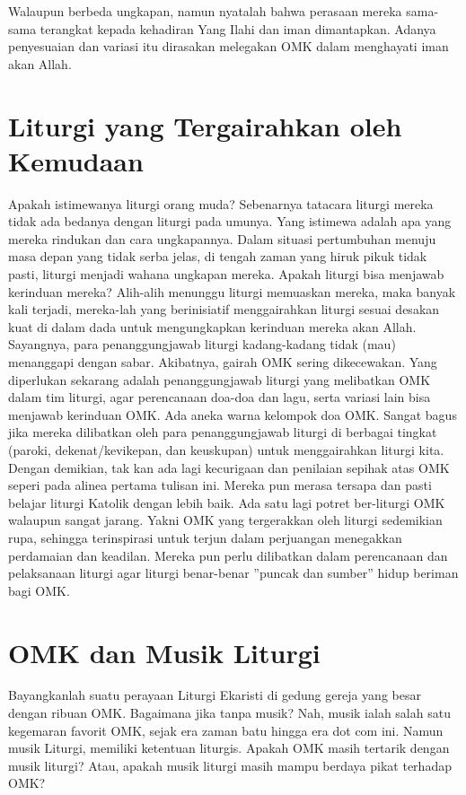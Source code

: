 Walaupun berbeda ungkapan, namun nyatalah bahwa perasaan mereka sama-sama terangkat kepada kehadiran Yang Ilahi dan iman dimantapkan. Adanya penyesuaian dan variasi itu dirasakan melegakan  OMK dalam menghayati iman akan Allah.

\section*{Liturgi yang Tergairahkan oleh Kemudaan}

Apakah istimewanya liturgi orang muda? Sebenarnya tatacara liturgi mereka tidak ada bedanya dengan liturgi pada umunya. Yang istimewa adalah apa yang mereka rindukan dan  cara ungkapannya. Dalam situasi pertumbuhan menuju masa depan yang tidak serba jelas, di tengah zaman yang hiruk pikuk tidak pasti, liturgi menjadi wahana ungkapan mereka. Apakah liturgi bisa menjawab kerinduan mereka? Alih-alih menunggu liturgi memuaskan mereka, maka banyak kali terjadi, mereka-lah yang berinisiatif menggairahkan liturgi sesuai desakan kuat di dalam dada untuk mengungkapkan kerinduan mereka akan Allah. Sayangnya, para penanggungjawab liturgi kadang-kadang tidak (mau) menanggapi dengan sabar. Akibatnya, gairah OMK sering dikecewakan. Yang diperlukan sekarang adalah penanggungjawab liturgi yang melibatkan OMK dalam tim liturgi, agar perencanaan doa-doa dan lagu, serta variasi lain bisa menjawab kerinduan OMK. Ada aneka warna kelompok doa OMK. Sangat bagus jika mereka dilibatkan oleh para penanggungjawab liturgi di berbagai tingkat (paroki, dekenat/kevikepan, dan keuskupan) untuk menggairahkan liturgi kita. Dengan demikian, tak kan ada lagi kecurigaan dan penilaian sepihak atas OMK seperi pada alinea pertama tulisan ini. Mereka pun merasa tersapa dan pasti belajar liturgi Katolik dengan lebih baik. Ada satu lagi potret ber-liturgi OMK walaupun sangat jarang. Yakni OMK yang tergerakkan oleh liturgi sedemikian rupa, sehingga terinspirasi untuk terjun dalam perjuangan menegakkan perdamaian dan keadilan. Mereka pun perlu dilibatkan dalam perencanaan dan pelaksanaan liturgi agar liturgi benar-benar ”puncak dan sumber” hidup beriman bagi OMK.

\section*{OMK dan Musik Liturgi}

Bayangkanlah suatu perayaan Liturgi Ekaristi di gedung gereja yang besar dengan ribuan OMK. Bagaimana jika tanpa musik? Nah, musik ialah salah satu kegemaran favorit OMK, sejak era zaman batu hingga era dot com ini. Namun musik Liturgi, memiliki ketentuan liturgis. Apakah OMK masih tertarik dengan musik liturgi? Atau, apakah musik liturgi masih mampu berdaya pikat terhadap OMK?


